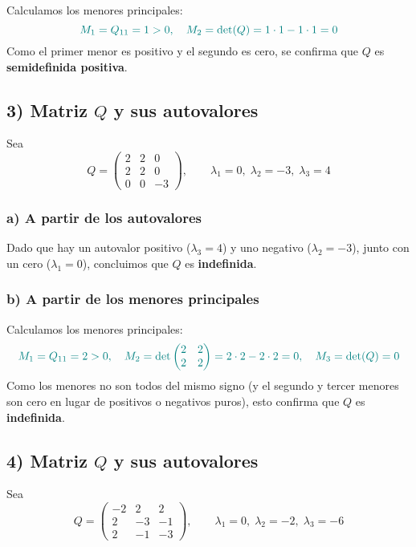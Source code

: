 \documentclass{article}
\begin{document}
Calculamos los menores principales:
\[
\color{teal}
M_1 = Q_{11} = 1 > 0,
\quad
M_2 = \det(Q) = 1\cdot1 - 1\cdot1 = 0
\]
Como el primer menor es positivo y el segundo es cero, se confirma que \(Q\) es \textbf{semidefinida positiva}.  

\subsection*{3) Matriz \(Q\) y sus autovalores}

Sea
\[
Q =
\begin{pmatrix}
2 & 2 & 0\\
2 & 2 & 0\\
0 & 0 & -3
\end{pmatrix},
\qquad
\lambda_1 = 0,\;\lambda_2 = -3,\;\lambda_3 = 4
\]

\subsubsection*{a) A partir de los autovalores}

Dado que hay un autovalor positivo (\(\lambda_3=4\)) y uno negativo (\(\lambda_2=-3\)), junto con un cero (\(\lambda_1=0\)), concluimos que \(Q\) es \textbf{indefinida}.

\subsubsection*{b) A partir de los menores principales}

Calculamos los menores principales:
\[
\color{teal}
M_1 = Q_{11} = 2 > 0,
\quad
M_2 = \det\begin{pmatrix}2 & 2\\2 & 2\end{pmatrix} = 2\cdot2 - 2\cdot2 = 0,
\quad
M_3 = \det(Q) = 0
\]
Como los menores no son todos del mismo signo (y el segundo y tercer menores son cero en lugar de positivos o negativos puros), esto confirma que \(Q\) es \textbf{indefinida}.


\subsection*{4) Matriz \(Q\) y sus autovalores}

Sea
\[
Q =
\begin{pmatrix}
-2 & 2 & 2\\[4pt]
2  & -3& -1\\[4pt]
2  & -1& -3
\end{pmatrix},
\qquad
\lambda_1 = 0,\;\lambda_2 = -2,\;\lambda_3 = -6
\]
\end{document}
